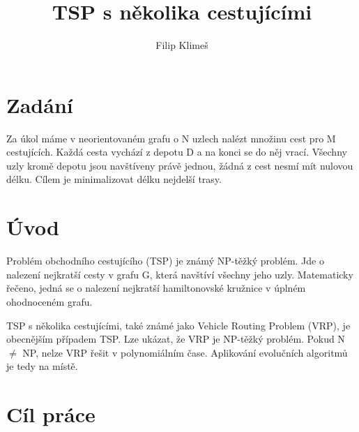 \documentclass[journal]{IEEEtrancz}
\begin{document}
\title{TSP s několika cestujícími}
\author{Filip Klimeš}

\maketitle

\begin{abstrakt}

\end{abstrakt}

\IEEEpeerreviewmaketitle

\section{Zadání}
Za úkol máme v neorientovaném grafu o N uzlech nalézt množinu cest pro M cestujících.
Každá cesta vychází z depotu D a na konci se do něj vrací. Všechny uzly kromě depotu
jsou navštíveny právě jednou, žádná z cest nesmí mít nulovou délku. Cílem je minimalizovat
délku nejdelší trasy.

\section{Úvod}
Problém obchodního cestujícího (TSP) je známý NP-těžký problém. Jde o nalezení nejkratší
cesty v grafu G, která navštíví všechny jeho uzly. Matematicky řečeno, jedná se o nalezení
nejkratší hamiltonovské kružnice v úplném ohodnoceném grafu.

TSP s několika cestujícími, také známé jako Vehicle Routing Problem (VRP), je obecnějším
případem TSP. Lze ukázat, že VRP je NP-těžký problém. Pokud N $\neq$ NP, nelze VRP řešit
v polynomiálním čase. Aplikování evolučních algoritmů je tedy na místě.

\section{Cíl práce}
\end{document}
